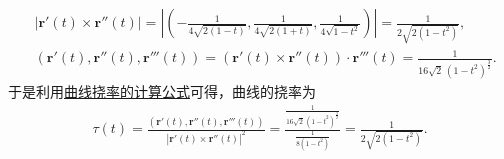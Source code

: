 \documentclass[../../main.tex]{subfiles}%
\begin{document}
\begin{solution}
\begin{align*}
\\
&\left| \boldsymbol{r}' \left( t \right) \times \boldsymbol{r}'' \left( t \right) \right|=\left| \left( -\frac{1}{4\sqrt{2\left( 1-t \right)}},\frac{1}{4\sqrt{2\left( 1+t \right)}},\frac{1}{4\sqrt{1-t^2}} \right) \right|=\frac{1}{2\sqrt{2\left( 1-t^2 \right)}},
\\
&\left( \boldsymbol{r}' \left( t \right) ,\boldsymbol{r}'' \left( t \right) ,\boldsymbol{r}''' \left( t \right) \right) =\left( \boldsymbol{r}' \left( t \right) \times \boldsymbol{r}'' \left( t \right) \right) \cdot \boldsymbol{r}''' \left( t \right) =\frac{1}{16\sqrt{2}\,\left( 1-t^2 \right) ^{\frac{3}{2}}}.
\end{align*}
于是利用\hyperref[theorem:微分几何-曲线挠率的计算公式]{曲线挠率的计算公式}可得，曲线的挠率为
\begin{align*}
\tau \left( t \right) =\frac{\left( \boldsymbol{r}' \left( t \right) ,\boldsymbol{r}'' \left( t \right) ,\boldsymbol{r}''' \left( t \right) \right)}{\left| \boldsymbol{r}' \left( t \right) \times \boldsymbol{r}'' \left( t \right) \right|^2}=\frac{\frac{1}{16\sqrt{2}\,\left( 1-t^2 \right) ^{\frac{3}{2}}}}{\frac{1}{8\left( 1-t^2 \right)}}=\frac{1}{2\sqrt{2\left( 1-t^2 \right)}}.
\end{align*}

\end{solution}
\end{document}
